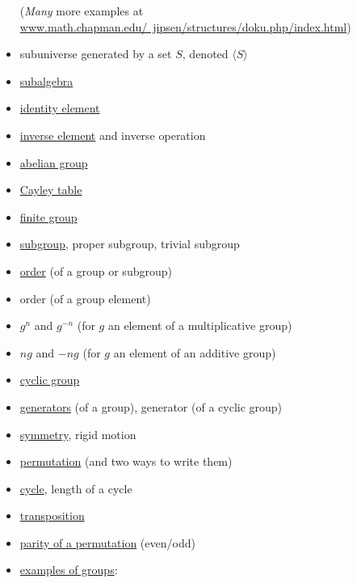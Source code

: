 \documentclass[12pt]{article}
\newcommand{\defn}[1]{#1}
\newcommand\<{\ensuremath{\langle}}
\renewcommand\>{\ensuremath{\rangle}}
\begin{document}
\begin{itemize}
(\emph{Many} more examples at 
\href{http://www.math.chapman.edu/~jipsen/structures/doku.php/index.html}{www.math.chapman.edu/~jipsen/structures/doku.php/index.html})

\item \defn{subuniverse generated by a set} $S$, denoted $\<S\>$
\item \href{http://en.wikipedia.org/wiki/Subalgebra}{\defn{subalgebra}}
\item \href{http://en.wikipedia.org/wiki/Identity_element}{identity element}
\item \href{http://en.wikipedia.org/wiki/Inverse_element}{inverse element} and inverse operation
\item \href{http://en.wikipedia.org/wiki/Abelian_group}{abelian group}
\item \href{http://en.wikipedia.org/wiki/Cayley_table}{Cayley table}
\item \href{http://en.wikipedia.org/wiki/Finite_group}{finite group}
\item \href{http://en.wikipedia.org/wiki/Subgroup}{subgroup}, proper subgroup, trivial subgroup
\item \href{http://en.wikipedia.org/wiki/Order_(group_theory)}{order} (of a group or subgroup)
\item order (of a group element)
\item $g^n$ and $g^{-n}$ (for $g$ an element of a multiplicative group)
\item $ng$ and $-ng$ (for $g$ an element of an additive group)
\item \href{http://en.wikipedia.org/wiki/Cyclic_group}{cyclic group}
\item \href{http://en.wikipedia.org/wiki/Generating_set_of_a_group}{generators} (of a group),
generator (of a cyclic group)
\item \href{http://en.wikipedia.org/wiki/Symmetry_in_mathematics}{symmetry}, rigid motion
\item \href{http://en.wikipedia.org/wiki/Permutation}{permutation} (and two ways to write them)
\item \href{http://en.wikipedia.org/wiki/Cycle_(mathematics)}{cycle}, length of a cycle
\item \href{http://en.wikipedia.org/wiki/Cycle_(mathematics)#Transpositions}{transposition}
\item \href{http://en.wikipedia.org/wiki/Parity_of_a_permutation}{parity of a permutation} (even/odd)
\item \href{http://en.wikipedia.org/wiki/Examples_of_groups}{examples of groups}: 

\end{itemize}
\end{document}
